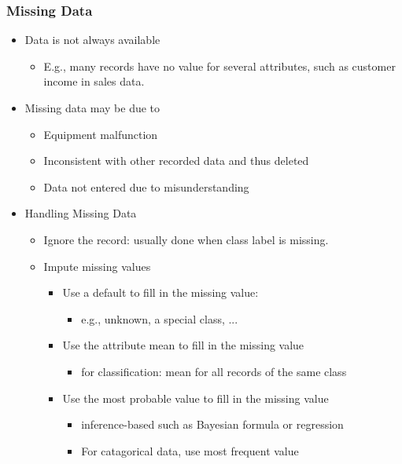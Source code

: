 \documentclass[../notes.tex]{subfiles}
\begin{document}
\subsubsection{Missing Data}
\begin{itemize}
  \item Data is not always available
  \begin{itemize}
    \item E.g., many records have no value for several attributes, such as customer income in sales data.
  \end{itemize}

  \item Missing data may be due to
  \begin{itemize}
    \item Equipment malfunction
    \item Inconsistent with other recorded data and thus deleted
    \item Data not entered due to misunderstanding
  \end{itemize}

  \item Handling Missing Data
  \begin{itemize}
    \item Ignore the record: usually done when class label is missing.
    \item Impute missing values
    \begin{itemize}
      \item Use a default to fill in the missing value:
      \begin{itemize}
        \item e.g., unknown, a special class, ...
      \end{itemize}

      \item Use the attribute mean to fill in the missing value
      \begin{itemize}
        \item for classification: mean for all records of the same class
      \end{itemize}        
          
      \item Use the most probable value to fill in the missing value
      \begin{itemize}
        \item inference-based such as Bayesian formula or regression
        \item For catagorical data, use most frequent value
      \end{itemize} 
    \end{itemize}     
  \end{itemize}
\end{itemize}
\end{document}
